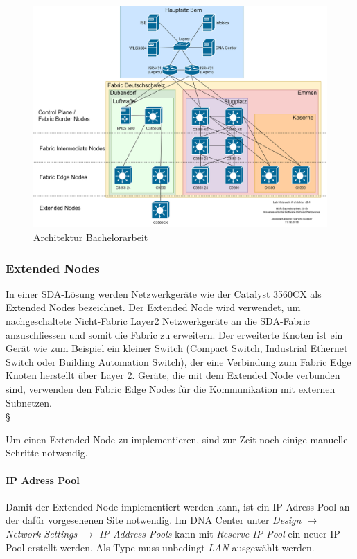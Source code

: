 \begin{figure}[H]
	\centering
	\includegraphics[width=1\linewidth]{img/Architecture/LabNetworkArchitecture-11-12}
	\caption{Architektur Bachelorarbeit}
	\label{fig:Architektur Bachelorarbeit}
\end{figure}




\subsubsection{Extended Nodes}
In einer SDA-Lösung werden Netzwerkgeräte wie der Catalyst 3560CX als Extended Nodes bezeichnet. Der  Extended Node wird verwendet, um nachgeschaltete Nicht-Fabric Layer2 Netzwerkgeräte an die SDA-Fabric anzuschliessen und somit die Fabric zu erweitern.
Der erweiterte Knoten ist ein Gerät wie zum Beispiel ein kleiner Switch (Compact Switch, Industrial Ethernet Switch oder Building Automation Switch), der eine Verbindung zum Fabric Edge Knoten herstellt
über Layer 2. Geräte, die mit dem Extended Node verbunden sind, verwenden den Fabric Edge Nodes für die Kommunikation mit externen Subnetzen.  \\§

Um einen Extended Node zu implementieren, sind zur Zeit noch einige manuelle Schritte notwendig.

\paragraph{IP Adress Pool} Damit der Extended Node implementiert werden kann, ist ein IP Adress Pool an der dafür vorgesehenen Site notwendig. Im DNA Center unter \textit{Design $\rightarrow$ Network Settings $\rightarrow$ IP Address Pools} kann mit \textit{Reserve IP Pool} ein neuer IP Pool erstellt werden. Als Type muss unbedingt \textit{LAN} ausgewählt werden.


